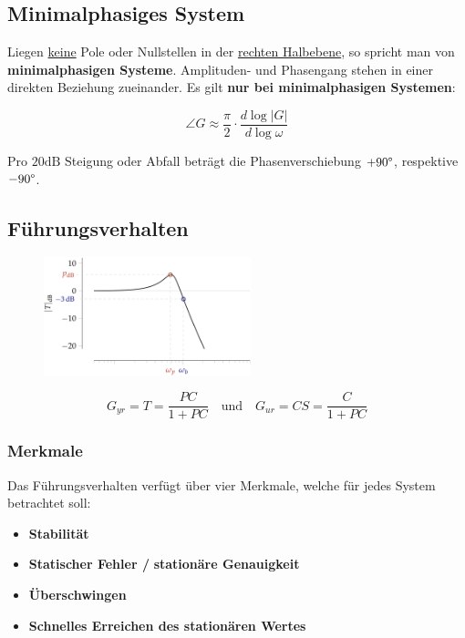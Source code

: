 \documentclass[
  10pt,
  a4paper,
  onecolumn]{article}
\providecommand{\tightlist}{%
  \setlength{\itemsep}{0pt}\setlength{\parskip}{0pt}}\usepackage{longtable,booktabs,array}
\numberwithin{equation}{section}
\begin{document}
\hypertarget{minimalphasiges-system}{%
\subsection{Minimalphasiges System}\label{minimalphasiges-system}}

Liegen \ul{keine} Pole oder Nullstellen in der \ul{rechten Halbebene},
so spricht man von \textbf{minimalphasigen Systeme}. Amplituden- und
Phasengang stehen in einer direkten Beziehung zueinander. Es gilt
\textbf{nur bei minimalphasigen Systemen}:

\[
\angle{G}\approx\frac{\pi}{2}\cdot\frac{d{\log\lvert G\rvert}}{d{\log{\omega}}}
\]

Pro \(20\text{dB}\) Steigung oder Abfall beträgt die Phasenverschiebung
\(+90\degree\), respektive \(-90\degree\).

\hypertarget{fuxfchrungsverhalten}{%
\subsection{Führungsverhalten}\label{fuxfchrungsverhalten}}

\begin{figure}[H]

{\centering \includegraphics[width=6cm,height=\textheight]{images/paste-35.png}

}

\end{figure}

\[
G_{yr}=T=\frac{PC}{1+PC}\quad\text{und}\quad G_{ur}=CS=\frac{C}{1+PC}
\]

\hypertarget{merkmale}{%
\subsubsection{Merkmale}\label{merkmale}}

Das Führungsverhalten verfügt über vier Merkmale, welche für jedes
System betrachtet soll:

\begin{itemize}
\tightlist
\item
  \textbf{Stabilität}
\item
  \textbf{Statischer Fehler /} \textbf{stationäre Genauigkeit}
\item
  \textbf{Überschwingen}
\item
  \textbf{Schnelles Erreichen des stationären Wertes}
\end{itemize}
\end{document}
